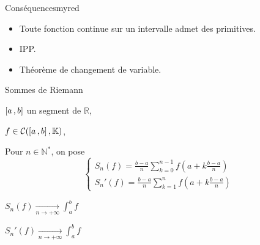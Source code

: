     \begin{omed}{Conséquences}{myred}
        \begin{itemize}
            \item Toute fonction continue sur un intervalle admet des primitives.
            \item IPP.
            \item Théorème de changement de variable.
        \end{itemize}
    \end{omed}

    \begin{theo}{Sommes de Riemann}{}
        \begin{soient}
            \item $\left[ a \, , b \right]$ un segment de $\mathbb{R}$,
            \item $f \in \mathcal{C}(\left[ a \, , b \right],\mathbb{K})$,
            \item Pour $n \in \mathbb{N}^*$, on pose
            \[ \left\{\begin{array}{l}
                S_n(f) = \frac{b-a}{n} \sum\limits_{k=0}^{n-1} f(a+k\frac{b-a}{n}) \\
                S_n'(f) = \frac{b-a}{n} \sum\limits_{k=1}^{n} f(a+k\frac{b-a}{n})
            \end{array} \right. \]
        \end{soient}
        \begin{alors}
            \item $S_n(f) \underset{n \rightarrow + \infty}{\longrightarrow} \int_{a}^{b}f$
            \item $S_n'(f) \underset{n \rightarrow + \infty}{\longrightarrow} \int_{a}^{b}f$
        \end{alors}
    \end{theo}


